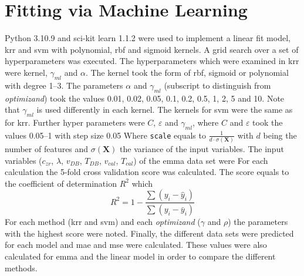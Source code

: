 \section{Fitting via Machine Learning}
Python 3.10.9 and sci-kit learn 1.1.2\cite{pedregosa2011scikit} were used to implement a linear fit model, \gls{krr} and \gls{svm} with polynomial, \gls{rbf} and sigmoid kernels. 
A grid search over a set of hyperparameters was executed. 
The hyperparameters which were examined in \gls{krr} were kernel, $\gamma_{ml}$ and $\alpha$.
The kernel took the form of \gls{rbf}, sigmoid or polynomial with degree 1--3.
The parameters $\alpha$ and $\gamma_{ml}$ (subscript to distinguish from \textit{optimizand}) took the values 0.01, 0.02, 0.05, 0.1, 0.2, 0.5, 1, 2, 5 and 10.
Note that $\gamma_{ml}$ is used differently in each kernel. 
The kernels for \gls{svm} were the same as for \gls{krr}. 
Further hyper parameters were $C$, $\varepsilon$ and $\gamma_{ml}$, 
where $C$ and $\varepsilon$ took the values 0.05--1 with step size 0.05 %
Where \texttt{scale} equals to $\frac{1}{d \cdot \sigma(\mathbf{X})}$ with $d$ being the number of features 
and $\sigma(\mathbf{X})$ the variance of the input variables. 
The input variables ($c_{zr}$, $\lambda$, $v_{DB}$, $T_{DB}$, $v_{cal}$, $T_{cal}$) 
of the \gls{emma} data set were 
For each calculation the 5-fold cross validation score was calculated. 
The score equals to the coefficient of determination $R^2$ which 
\begin{equation}
	\label{eq:r2}
	R^2 = 1-\frac{\sum (y_i - \hat{y}_i)}{\sum (y_i - \bar{y}_i)}
\end{equation}
For each method (\gls{krr} and \gls{svm}) and each \textit{optimizand} ($\gamma$ and $\rho$) 
the parameters with the highest score were noted.
% 
Finally, the different data sets were predicted for each model and \gls{mae} and \gls{mse} were calculated.
These values were also calculated for \gls{emma} and the linear model in order to compare the different methods. 
